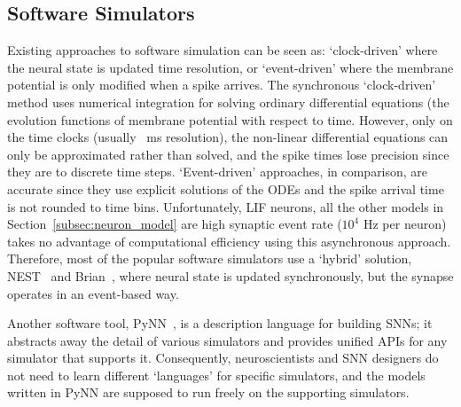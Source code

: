\subsection{Software Simulators}
Existing approaches to software simulation can be seen as: `clock-driven' where the neural state is updated \DIFdelbegin {}\DIFdelend \DIFaddbegin {}\DIFaddend time resolution, or `event-driven' where the membrane potential is only modified when a spike arrives.
The synchronous `clock-driven' method uses numerical integration for solving \DIFaddbegin {}\DIFaddend ordinary differential equations (\DIFdelbegin {}\DIFdelend \DIFaddbegin {}\DIFaddend the evolution functions of \DIFaddbegin {}\DIFaddend membrane potential with respect to time.
However, \DIFdelbegin {}\DIFdelend \DIFaddbegin {}\DIFaddend only on the time clocks (usually \DIFdelbegin {}\DIFdelend \DIFaddbegin {}~ms resolution), the non-linear differential equations can only be approximated rather than solved, and the spike times lose precision since they are \DIFdelbegin {}\DIFdelend \DIFaddbegin {}\DIFaddend to discrete time steps.
`Event-driven' approaches, in comparison, are accurate since they use explicit solutions of the ODEs and the spike arrival time is not rounded to time bins.
Unfortunately, \DIFdelbegin {}\DIFdelend \DIFaddbegin {}\DIFaddend LIF neurons, all the other models \DIFdelbegin {}\DIFdelend \DIFaddbegin {}\DIFaddend in Section~\ref{subsec:neuron_model} are \DIFdelbegin {}\DIFdelend \DIFaddbegin {}\DIFaddend high synaptic event rate ($10^4$ Hz per neuron) takes no advantage of computational efficiency using this asynchronous approach.
Therefore, most of the popular software simulators use a `hybrid' solution, \DIFdelbegin {}\DIFdelend \DIFaddbegin {}\DIFaddend NEST~\citep{gewaltig2007nest} and Brian~\citep{goodman2008brian}, where 
neural state is updated synchronously, but the synapse operates in an event-based way.

Another software tool, PyNN~\citep{davison2008pynn}, is a description language for building SNNs;
it abstracts away the detail of various simulators and provides unified APIs for any simulator that supports it.
Consequently, neuroscientists and SNN designers do not need to learn different `languages' for specific simulators, and the models written in PyNN are supposed to run freely on the supporting simulators.

